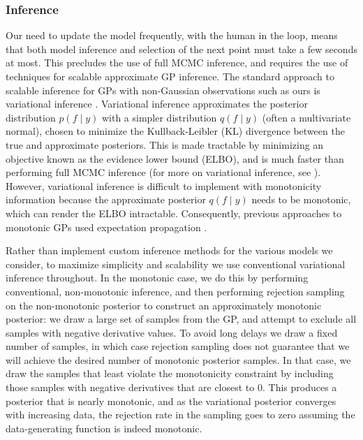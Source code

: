 \documentclass[../main.tex]{subfiles}
\begin{document}
\subsubsection{Inference}

Our need to update the model frequently, with the human in the loop, means that both model inference and selection of the next point must take a few seconds at most. This precludes the use of full MCMC inference, and requires the use of techniques for scalable approximate GP inference. The standard approach to scalable inference for GPs with non-Gaussian observations such as ours is variational inference \citep[e.g.][]{rasmussen2006gaussian}. Variational inference approximates the posterior distribution $p(f\mid y)$ with a simpler distribution $q(f\mid y)$ (often a multivariate normal), chosen to minimize the Kullback-Leibler (KL) divergence between the true and approximate posteriors. This is made tractable by minimizing an objective known as the evidence lower bound (ELBO), and is much faster than performing full MCMC inference (for more on variational inference, see \cite{Blei2017}). However, variational inference is difficult to implement with monotonicity information because the approximate posterior $q(f\mid y)$ needs to be monotonic, which can render the ELBO intractable.
Consequently, previous approaches to monotonic GPs used expectation propagation \citep{Riihimaki2010}.


Rather than implement custom inference methods for the various models we consider, to maximize simplicity and scalability we use conventional variational inference throughout. In the monotonic case, we do this by performing conventional, non-monotonic inference, and then performing rejection sampling on the non-monotonic posterior to construct an approximately monotonic posterior: we draw a large set of samples from the GP, and attempt to exclude all samples with negative derivative values.
To avoid long delays we draw a fixed number of samples, in which case rejection sampling does not guarantee that we will achieve the desired number of monotonic posterior samples. In that case, we draw the samples that least violate the monotonicity constraint by including those samples with negative derivatives that are closest to 0. This produces a posterior that is nearly monotonic, and as the variational posterior converges with increasing data, the rejection rate in the sampling goes to zero assuming the data-generating function is indeed monotonic.
\end{document}
